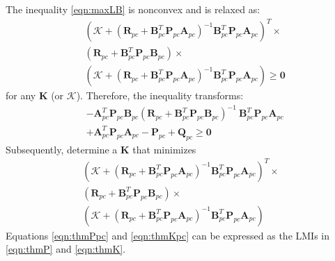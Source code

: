 \documentclass[letterpaper, 10 pt, conference]{ieeeconf}  %
\newcommand{\vo}[1]{\boldsymbol{#1}}
\begin{document}
The inequality \eqref{eqn:maxLB} is nonconvex and is relaxed as:
\begin{align}
   &(\vo{\mathcal{K}} + (\vo{R}_{pc} + \vo{B}_{pc}^T \vo{P}_{pc} \vo{A}_{pc})^{-1} \vo{B}_{pc}^T \vo{P}_{pc} \vo{A}_{pc})^T  \times \nonumber\\
   &(\vo{R}_{pc} + \vo{B}_{pc}^T \vo{P}_{pc} \vo{B}_{pc})  \times \nonumber\\
   &(\vo{\mathcal{K}} + (\vo{R}_{pc} + \vo{B}_{pc}^T \vo{P}_{pc} \vo{A}_{pc})^{-1} \vo{B}_{pc}^T \vo{P}_{pc} \vo{A}_{pc}) \geq \vo{0}
\end{align}
for any $\vo{K}$ (or $\vo{\mathcal{K}}$). Therefore, the inequality transforms:
\begin{align}
   & - \vo{A}_{pc}^T \vo{P}_{pc} \vo{B}_{pc} (\vo{R}_{pc} + \vo{B}_{pc}^T \vo{P}_{pc} \vo{B}_{pc})^{-1} \ \vo{B}_{pc}^T \vo{P}_{pc} \vo{A}_{pc} \nonumber\\
   & + \vo{A}_{pc}^T \vo{P}_{pc} \vo{A}_{pc} - \vo{P}_{pc} + \vo{Q}_{pc} \geq \vo{0}
   \label{eqn:thmPpc}
\end{align}
Subsequently, determine a $\vo{K}$ that minimizes
\begin{align}
        (\vo{\mathcal{K}} + (\vo{R}_{pc} + \vo{B}_{pc}^T \vo{P}_{pc} \vo{A}_{pc})^{-1} \vo{B}_{pc}^T \vo{P}_{pc} \vo{A}_{pc})^T \times \nonumber\\
        (\vo{R}_{pc} +  \vo{B}_{pc}^T \vo{P}_{pc} \vo{B}_{pc}) \times \nonumber\\
        (\vo{\mathcal{K}} + (\vo{R}_{pc} + \vo{B}_{pc}^T \vo{P}_{pc} \vo{A}_{pc})^{-1} \vo{B}_{pc}^T \vo{P}_{pc} \vo{A}_{pc})
        \label{eqn:thmKpc}
\end{align}
Equations \eqref{eqn:thmPpc} and \eqref{eqn:thmKpc} can be expressed as the LMIs in \eqref{eqn:thmP} and \eqref{eqn:thmK}.
\end{document}
